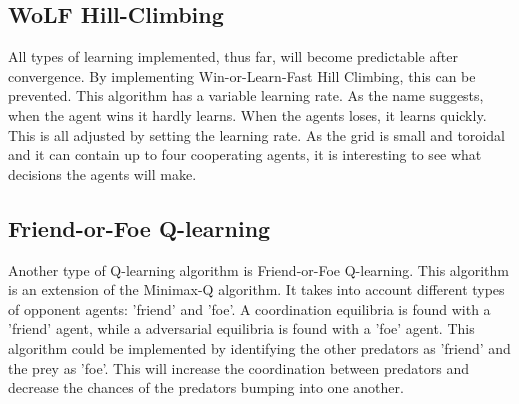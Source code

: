\subsection{WoLF Hill-Climbing}
All types of learning implemented, thus far, will become predictable after convergence. By implementing Win-or-Learn-Fast Hill Climbing, this can be prevented. This algorithm has a variable learning rate. As the name suggests, when the agent wins it hardly learns. When the agents loses, it learns quickly. This is all adjusted by setting the learning rate. As the grid is small and toroidal and it can contain up to four cooperating agents, it is interesting to see what decisions the agents will make.

\subsection{Friend-or-Foe Q-learning}
Another type of Q-learning algorithm is Friend-or-Foe Q-learning\cite{littman2001friend}. This algorithm is an extension of the Minimax-Q algorithm. It takes into account different types of opponent agents: 'friend' and 'foe'. A coordination equilibria is found with a 'friend' agent, while a adversarial equilibria is found with a 'foe' agent. This algorithm could be implemented by identifying the other predators as 'friend' and the prey as 'foe'. This will increase the coordination between predators and decrease the chances of the predators bumping into one another.